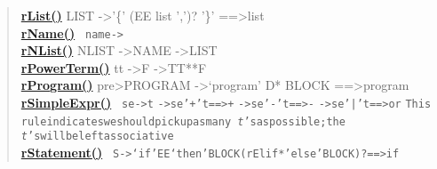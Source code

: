 {{{{{\begin{verse}
\hyperlink{org.openmrs.module.dssmodule.parser.Parser.rList()}{{\bf rList()}} LIST -\textgreater  '\{' (EE list ',')? '\}' ==\textgreater  list\\
\hyperlink{org.openmrs.module.dssmodule.parser.Parser.rName()}{{\bf rName()}} \texttt{\small
\mbox{}\newline \phantom{ }name\phantom{ }-\textgreater \phantom{ }}
\\
\hyperlink{org.openmrs.module.dssmodule.parser.Parser.rNList()}{{\bf rNList()}} NLIST -\textgreater  NAME -\textgreater  LIST\\
\hyperlink{org.openmrs.module.dssmodule.parser.Parser.rPowerTerm()}{{\bf rPowerTerm()}} tt -\textgreater  F -\textgreater  TT**F\\
\hyperlink{org.openmrs.module.dssmodule.parser.Parser.rProgram()}{{\bf rProgram()}} pre\textgreater  PROGRAM -\textgreater  ‘program’ D* BLOCK ==\textgreater  program\\
\hyperlink{org.openmrs.module.dssmodule.parser.Parser.rSimpleExpr()}{{\bf rSimpleExpr()}} \texttt{\small
\mbox{}\newline \phantom{ }se\phantom{ }-\textgreater \phantom{ }t}\mbox{}\newline
\texttt{\small \phantom{ }-\textgreater \phantom{ }se\phantom{ }'+'\phantom{ }t\phantom{ }==\textgreater \phantom{ }+}\mbox{}\newline
\texttt{\small \phantom{ }-\textgreater \phantom{ }se\phantom{ }'-'\phantom{ }t\phantom{ }==\textgreater \phantom{ }-}\mbox{}\newline
\texttt{\small \phantom{ }-\textgreater \phantom{ }se\phantom{ }'|'\phantom{ }t\phantom{ }==\textgreater \phantom{ }or}\mbox{}\newline
\texttt{\small \phantom{ }This}\mbox{}\newline
\texttt{\small \phantom{ }rule\phantom{ }indicates\phantom{ }we\phantom{ }should\phantom{ }pick\phantom{ }up\phantom{ }as\phantom{ }many\phantom{ }\textit{ t}'s\phantom{ }as\phantom{ }possible;\phantom{ }the}\mbox{}\newline
\texttt{\small \phantom{ }\textit{ t}'s\phantom{ }will\phantom{ }be\phantom{ }left\phantom{ }associative}
\\
\hyperlink{org.openmrs.module.dssmodule.parser.Parser.rStatement()}{{\bf rStatement()}} \texttt{\small
\mbox{}\newline \phantom{ }S\phantom{ }-\textgreater \phantom{ }\phantom{ }‘if’\phantom{ }EE\phantom{ }‘then’\phantom{ }BLOCK\phantom{ }(\phantom{ }rElif*\phantom{ }'else'\phantom{ }BLOCK)?\phantom{ }==\textgreater \phantom{ }if}\mbox{}\newline

\end{verse}}}}}}
